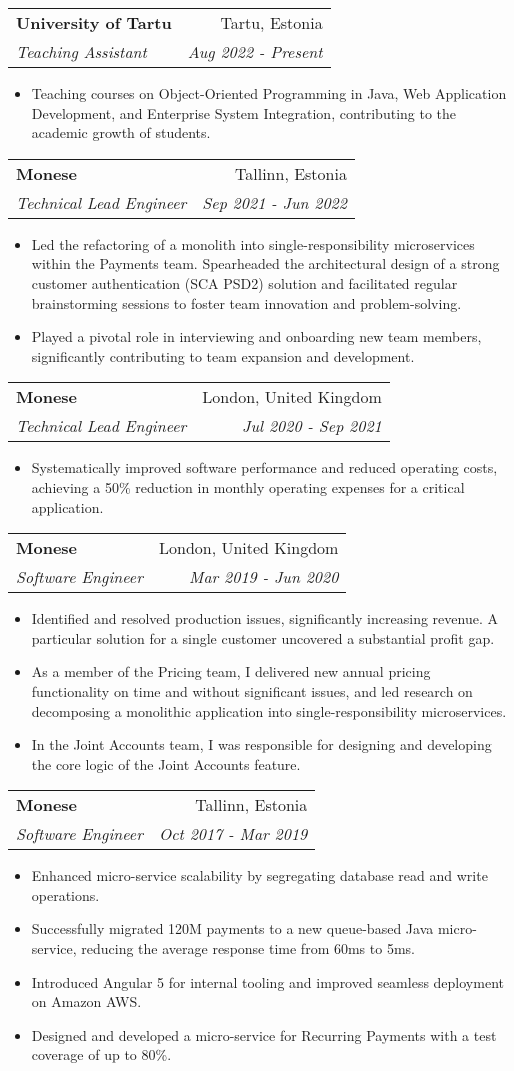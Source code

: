 \documentclass[11pt,a4paper,oneside]{report}
\makeatletter
\newcommand{\resumeItemWithoutTitle}[2]{
    \item\small{
        \textbf{#1}{#2\vspace{-2pt}}
    }
}
\newcommand{\resumeSubheading}[4]{
    \vspace{-1pt}\item
    \begin{tabular*}{0.97\textwidth}[t]{l@{\extracolsep{\fill}}r}
        \textbf{#1} & #2 \\
        \textit{\small#3} & \textit{\small #4} \\
    \end{tabular*}\vspace{-5pt}
}
\newcommand{\resumeItemListStart}{\begin{itemize}}
\newcommand{\resumeItemListEnd}{\end{itemize}\vspace{-5pt}}
\makeatother
\begin{document}
  \resumeSubheading
  {University of Tartu}{Tartu, Estonia}
  {Teaching Assistant}{Aug 2022 - Present}
      \resumeItemListStart
          \resumeItemWithoutTitle{}
          {Teaching courses on Object-Oriented Programming in Java, Web Application Development, and Enterprise System Integration, contributing to the academic growth of students.}
      \resumeItemListEnd
  
  \resumeSubheading
  {Monese}{Tallinn, Estonia}
  {Technical Lead Engineer}{Sep 2021 - Jun 2022}
    \resumeItemListStart
      \resumeItemWithoutTitle{}
      {Led the refactoring of a monolith into single-responsibility microservices within the Payments team. Spearheaded the architectural design of a strong customer authentication (SCA PSD2) solution and facilitated regular brainstorming sessions to foster team innovation and problem-solving.}
      \resumeItemWithoutTitle{}
      {Played a pivotal role in interviewing and onboarding new team members, significantly contributing to team expansion and development.}
    \resumeItemListEnd
  
  \resumeSubheading
  {Monese}{London, United Kingdom}
  {Technical Lead Engineer}{Jul 2020 - Sep 2021}
      \resumeItemListStart
          \resumeItemWithoutTitle{}
          {Systematically improved software performance and reduced operating costs, achieving a 50\% reduction in monthly operating expenses for a critical application.}
      \resumeItemListEnd
  
  \resumeSubheading
  {Monese}{London, United Kingdom}
  {Software Engineer}{Mar 2019 - Jun 2020}
      \resumeItemListStart
          \resumeItemWithoutTitle{}
          {Identified and resolved production issues, significantly increasing revenue. A particular solution for a single customer uncovered a substantial profit gap.}
          \resumeItemWithoutTitle{}
          {As a member of the Pricing team, I delivered new annual pricing functionality on time and without significant issues, and led research on decomposing a monolithic application into single-responsibility microservices.}
          \resumeItemWithoutTitle{}
          {In the Joint Accounts team, I was responsible for designing and developing the core logic of the Joint Accounts feature.}
      \resumeItemListEnd
  
  \resumeSubheading
  {Monese}{Tallinn, Estonia}
  {Software Engineer}{Oct 2017 - Mar 2019}
    \resumeItemListStart
      \resumeItemWithoutTitle{}
      {Enhanced micro-service scalability by segregating database read and write operations.}
      \resumeItemWithoutTitle{}
      {Successfully migrated 120M payments to a new queue-based Java micro-service, reducing the average response time from 60ms to 5ms.}
      \resumeItemWithoutTitle{}
      {Introduced Angular 5 for internal tooling and improved seamless deployment on Amazon AWS.}
      \resumeItemWithoutTitle{}
      {Designed and developed a micro-service for Recurring Payments with a test coverage of up to 80\%.}
    \resumeItemListEnd
  
\end{document}

